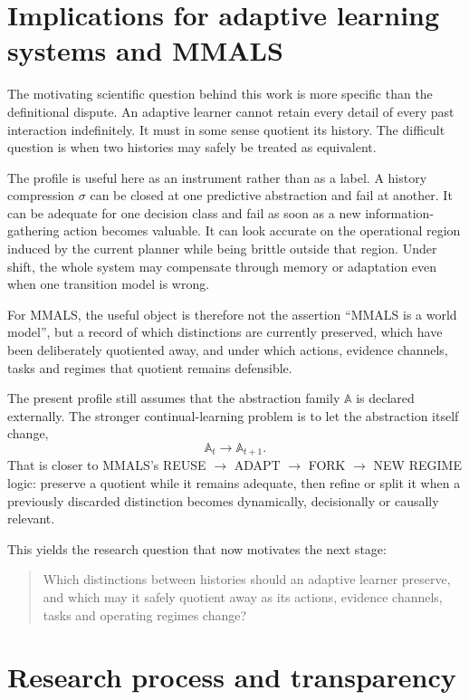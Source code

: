 \documentclass[10pt]{article}
\newcommand{\Aabs}{\mathbb A}
\begin{document}
\section{Implications for adaptive learning systems and MMALS}

The motivating scientific question behind this work is more specific than the definitional dispute. An adaptive learner cannot retain every detail of every past interaction indefinitely. It must in some sense quotient its history. The difficult question is when two histories may safely be treated as equivalent.

The profile is useful here as an instrument rather than as a label. A history compression $\sigma$ can be closed at one predictive abstraction and fail at another. It can be adequate for one decision class and fail as soon as a new information-gathering action becomes valuable. It can look accurate on the operational region induced by the current planner while being brittle outside that region. Under shift, the whole system may compensate through memory or adaptation even when one transition model is wrong.

For MMALS, the useful object is therefore not the assertion ``MMALS is a world model'', but a record of which distinctions are currently preserved, which have been deliberately quotiented away, and under which actions, evidence channels, tasks and regimes that quotient remains defensible.

The present profile still assumes that the abstraction family $\Aabs$ is declared externally. The stronger continual-learning problem is to let the abstraction itself change,
\[
\Aabs_t\rightarrow\Aabs_{t+1}.
\]
That is closer to MMALS's REUSE $\rightarrow$ ADAPT $\rightarrow$ FORK $\rightarrow$ NEW REGIME logic: preserve a quotient while it remains adequate, then refine or split it when a previously discarded distinction becomes dynamically, decisionally or causally relevant.

This yields the research question that now motivates the next stage:
\begin{quote}
Which distinctions between histories should an adaptive learner preserve, and which may it safely quotient away as its actions, evidence channels, tasks and operating regimes change?
\end{quote}

\section{Research process and transparency}
\end{document}
